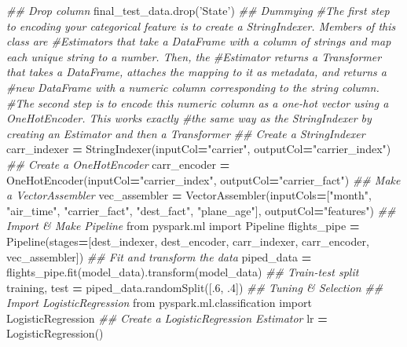 \documentclass[]{book}
\newenvironment{Shaded}{\begin{snugshade}}{\end{snugshade}}
\newcommand{\DecValTok}[1]{\textcolor[rgb]{0.00,0.00,0.81}{#1}}
\newcommand{\StringTok}[1]{\textcolor[rgb]{0.31,0.60,0.02}{#1}}
\newcommand{\ImportTok}[1]{#1}
\newcommand{\CommentTok}[1]{\textcolor[rgb]{0.56,0.35,0.01}{\textit{#1}}}
\newcommand{\OperatorTok}[1]{\textcolor[rgb]{0.81,0.36,0.00}{\textbf{#1}}}
\newcommand{\NormalTok}[1]{#1}
\begin{document}
\begin{Shaded}
\begin{Highlighting}[]
\CommentTok{## Drop column}
\NormalTok{final_test_data.drop(}\StringTok{'State'}\NormalTok{)}
\CommentTok{## Dummying}
\CommentTok{#The first step to encoding your categorical feature is to create a StringIndexer. Members of this class are #Estimators that take a DataFrame with a column of strings and map each unique string to a number. Then, the #Estimator returns a Transformer that takes a DataFrame, attaches the mapping to it as metadata, and returns a #new DataFrame with a numeric column corresponding to the string column.}
\CommentTok{#The second step is to encode this numeric column as a one-hot vector using a OneHotEncoder. This works exactly #the same way as the StringIndexer by creating an Estimator and then a Transformer}
\CommentTok{## Create a StringIndexer}
\NormalTok{carr_indexer }\OperatorTok{=}\NormalTok{ StringIndexer(inputCol}\OperatorTok{=}\StringTok{"carrier"}\NormalTok{, outputCol}\OperatorTok{=}\StringTok{"carrier_index"}\NormalTok{)}
\CommentTok{## Create a OneHotEncoder}
\NormalTok{carr_encoder }\OperatorTok{=}\NormalTok{ OneHotEncoder(inputCol}\OperatorTok{=}\StringTok{"carrier_index"}\NormalTok{, outputCol}\OperatorTok{=}\StringTok{"carrier_fact"}\NormalTok{)}
\CommentTok{## Make a VectorAssembler}
\NormalTok{vec_assembler }\OperatorTok{=}\NormalTok{ VectorAssembler(inputCols}\OperatorTok{=}\NormalTok{[}\StringTok{"month"}\NormalTok{, }\StringTok{"air_time"}\NormalTok{, }\StringTok{"carrier_fact"}\NormalTok{, }\StringTok{"dest_fact"}\NormalTok{, }\StringTok{"plane_age"}\NormalTok{], outputCol}\OperatorTok{=}\StringTok{"features"}\NormalTok{)}
\CommentTok{## Import & Make Pipeline}
\ImportTok{from}\NormalTok{ pyspark.ml }\ImportTok{import}\NormalTok{ Pipeline}
\NormalTok{flights_pipe }\OperatorTok{=}\NormalTok{ Pipeline(stages}\OperatorTok{=}\NormalTok{[dest_indexer, dest_encoder, carr_indexer, carr_encoder, vec_assembler])}
\CommentTok{## Fit and transform the data}
\NormalTok{piped_data }\OperatorTok{=}\NormalTok{ flights_pipe.fit(model_data).transform(model_data)}
\CommentTok{## Train-test split}
\NormalTok{training, test }\OperatorTok{=}\NormalTok{ piped_data.randomSplit([.}\DecValTok{6}\NormalTok{, .}\DecValTok{4}\NormalTok{])}
\CommentTok{## Tuning & Selection}
\CommentTok{## Import LogisticRegression}
\ImportTok{from}\NormalTok{ pyspark.ml.classification }\ImportTok{import}\NormalTok{ LogisticRegression}
\CommentTok{## Create a LogisticRegression Estimator}
\NormalTok{lr }\OperatorTok{=}\NormalTok{ LogisticRegression()}

\end{Highlighting}
\end{Shaded}
\end{document}
